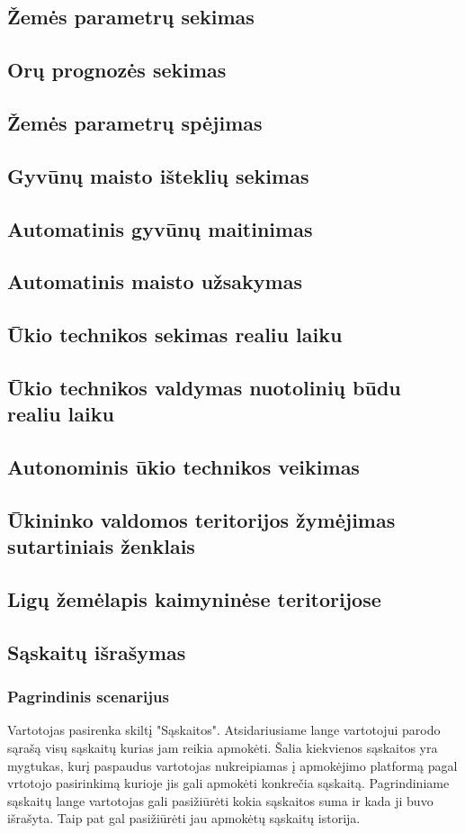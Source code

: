 \documentclass[oneside]{VUMIFPSkursinis}
\begin{document}
\subsection{Žemės parametrų sekimas}
\subsection{Orų prognozės sekimas}
\subsection{Žemės parametrų spėjimas}
\subsection{Gyvūnų maisto išteklių sekimas}
\subsection{Automatinis gyvūnų maitinimas}
\subsection{Automatinis maisto užsakymas}
\subsection{Ūkio technikos sekimas realiu laiku}
\subsection{Ūkio technikos valdymas nuotolinių būdu realiu laiku}
\subsection{Autonominis ūkio technikos veikimas}
\subsection{Ūkininko valdomos teritorijos žymėjimas sutartiniais ženklais}
\subsection{Ligų žemėlapis kaimyninėse teritorijose}

\subsection{Sąskaitų išrašymas}
	\subsubsection{Pagrindinis scenarijus}
	Vartotojas pasirenka skiltį "Sąskaitos". Atsidariusiame lange vartotojui parodo sąrašą visų sąskaitų kurias jam reikia apmokėti. Šalia kiekvienos sąskaitos yra mygtukas, kurį paspaudus vartotojas nukreipiamas į apmokėjimo platformą pagal vrtotojo pasirinkimą kurioje jis gali apmokėti konkrečia sąskaitą. Pagrindiniame sąskaitų lange vartotojas gali pasižiūrėti kokia sąskaitos suma ir kada ji buvo išrašyta. Taip pat gal pasižiūrėti jau apmokėtų sąskaitų istorija.
\end{document}
